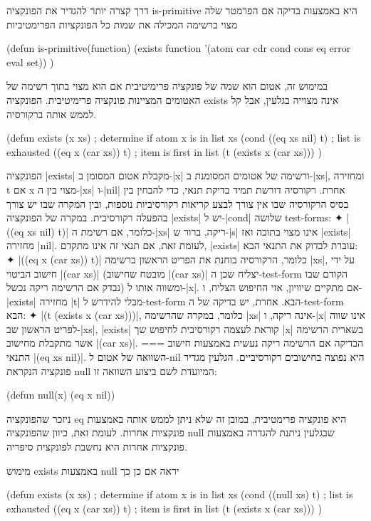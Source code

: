 \documentclass[a4paper,12pt,reqno]{article}
\begin{document}
דרך קצרה יותר להגדיר את הפונקציה is-primitive היא באמצעות בדיקה אם הפרמטר
שלה מצוי ברשימה המכילה את שמות כל הפונקציות הפרימטיביות
\begin{LISP}
(defun is-primitive(function)
  (exists function '(atom car cdr cond cons eq error eval set))
)
\end{LISP}
במימוש זה, אטום הוא שמה של פונקציה פרימיטיבית אם הוא מצוי בתוך רשימה של האטומים
המציינות פונקציה פרימיטיבית. הפונקציה exists אינה מצוייה בגלעין, אבל קל לממש
אותה ברקורסיה.
\begin{LISP}
(defun exists (x xs) ; determine if atom x is in list xs
  (cond
    ((eq xs nil) t) ; list is exhausted
    ((eq x (car xs)) t) ; item is first in list
    (t (exists x (car xs)))
)
\end{LISP}
הפונקציה \T|exists| מקבלת אטום המסומן ב-\T|x| ורשימה של אטומים המסומנת
ב-\T|xs|, ומחזירה t אם x מצוי בין ה-\T|xs| ו-\T|nil| אחרת. רקורסיה דורשת תמיד
בדיקת תנאי, כדי להבחין בין בסיס הרקורסיה שבו אין צורך לבצע קריאות רקורסיביות
נוספות, ובין המקרה שבו יש צורך בהפעלה רקורסיבית. במקרה של הפונקציה \T|exists|
יש ל-\T|cond| שלושה test-forms:
✦ \T|((eq xs nil) t)| כלומר, אם רשימת ה-\T|xs| ריקה, ברור ש-\T|s| אינו מצוי
בתוכה ואז \T|exists| מחזירה \T|nil|. לעומת זאת, אם תנאי זה אינו מתקדם,
\T|exists| עוברת לבדוק את התנאי הבא:
✦ \T|((eq x (car xs)) t)| כלומר, הרקורסיה בוחנת את הפריט הראשון ברשימה \T|xs|,
על ידי חישוב הביטוי \T|(car xs)| (מובטח שחישוב \T|(car xs)| יצליח שכן
ה-test-form הקודם שבו נבדק אם הרשימה ריקה נכשל) ומשווה אותו ל-\T|x|. אם מתקיים
שיוויון, אזי החיפוש הצליח, ו-\T|exists| מחזירה \T|t| מבלי להידרש ל-test-form
הבא. אחרת, יש בדיקה של ה-test-form הבא:
✦ \T|(t (exists x (car xs)))|, כלומר, במקרה שהרשימה \T|xs| אינה ריקה, ו-\T|x|
אינו שווה לפריט הראשון שב-\T|xs|, \T|exists| קוראת לעצמה רקורסיבית לחיפוש שך
\T|x| בשארית הרשימה אשר מתקבלת מחישוב \T|(car xs)|.
===
הבדיקה אם הרשימה ריקה נעשית באמצעות חישוב התנאי \T|(eq xs nil)|. השוואה של
אטום ל-nil היא נפוצה בחישובים רקורסיביים. הגלעין מגדיר פונקציה הנקראת null
המיועדת לשם ביצוע השוואה זו: \begin{LISP}
(defun null(x) (eq x nil))
\end{LISP}
ניזכר שהפונקציה eq היא פונקציה פרימטיבית, במובן זה שלא ניתן לממש אותה באמצעות
פונקציות אחרות. לעומת זאת, כיוון שהפונקציה null שבגלעין ניתנת להגדרה באמצעות
פונקציות אחרות היא נחשבת לפונקצית סיפריה.

מימוש exists באמצעות null יראה אם כן כך
\begin{LISP}
(defun exists (x xs) ; determine if atom x is in list xs
  (cond
    ((null xs) t) ; list is exhausted
    ((eq x (car xs)) t) ; item is first in list
    (t (exists x (car xs)))
)
\end{LISP}
\end{document}
